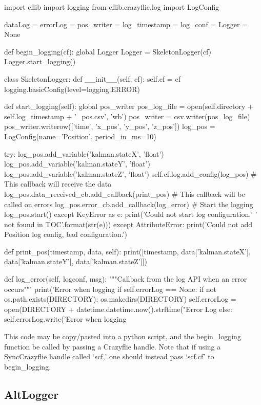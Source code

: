 \documentclass[]{article}
\begin{document}
\begin{Python}
import cflib
import logging
from cflib.crazyflie.log import LogConfig

dataLog = errorLog = pos_writer = log_timestamp = log_conf = Logger = None

def begin_logging(cf):
	global Logger	
	Logger = SkeletonLogger(cf)
	Logger.start_logging()

class SkeletonLogger:
	def __init__(self, cf):	
		self.cf = cf
		logging.basicConfig(level=logging.ERROR)

	def start_logging(self):
		global pos_writer
		pos_log_file = open(self.directory + self.log_timestamp 
			+ '_pos.csv', 'wb')
		pos_writer = csv.writer(pos_log_file)
		pos_writer.writerow(['time', 'x_pos', 'y_pos', 'z_pos'])
		log_pos = LogConfig(name='Position', period_in_ms=10)
		
		try:
			log_pos.add_variable('kalman.stateX', 'float')
			log_pos.add_variable('kalman.stateY', 'float')
			log_pos.add_variable('kalman.stateZ', 'float')
			self.cf.log.add_config(log_pos)
			# This callback will receive the data
			log_pos.data_received_cb.add_callback(print_pos)
			# This callback will be called on errors
			log_pos.error_cb.add_callback(log_error)
			# Start the logging
			log_pos.start()
		except KeyError as e:
			print('Could not start log configuration,'
				'{} not found in TOC'.format(str(e)))
		except AttributeError:
			print('Could not add Position log config, bad configuration.')
		
	def print_pos(timestamp, data, self):
		print([timestamp, data['kalman.stateX'], data['kalman.stateY'],
			data['kalman.stateZ']])
	
	def log_error(self, logconf, msg):
		"""Callback from the log API when an error occurs"""
		print('Error when logging %
		if self.errorLog == None:
			if not os.path.exists(DIRECTORY):
				os.makedirs(DIRECTORY)
			self.errorLog = open(DIRECTORY + datetime.datetime.now().strftime("Error Log %
		else:
			self.errorLog.write('Error when logging %
\end{Python}

\noindent This code may be copy/pasted into a python script, and the begin\_logging function be called by passing a Crazyflie handle. Note that if using a SyncCrazyflie handle called `scf,' one should instead pass `scf.cf' to begin\_logging. \\

\subsection{AltLogger}
\end{document}
